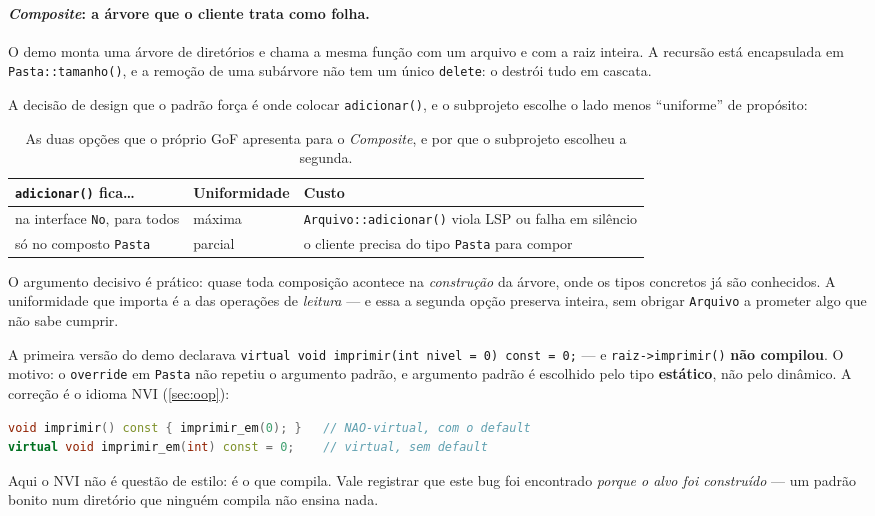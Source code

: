 \paragraph{\emph{Composite}: a árvore que o cliente trata como folha.} O demo
monta uma árvore de diretórios e chama a mesma função com um arquivo e com a
raiz inteira. A recursão está encapsulada em \texttt{Pasta::tamanho()}, e a
remoção de uma subárvore não tem um único \texttt{delete}: o
 destrói tudo em cascata.

A decisão de design que o padrão força é onde colocar \texttt{adicionar()}, e o
subprojeto escolhe o lado menos ``uniforme'' de propósito:

\begin{table}[htbp]
\centering
\caption{As duas opções que o próprio GoF apresenta para o \emph{Composite}, e
         por que o subprojeto escolheu a segunda.}
\label{tab:composite-opcoes}
\footnotesize
\begin{tabular}{@{}lll@{}}
\toprule
\textbf{\texttt{adicionar()} fica\ldots} & \textbf{Uniformidade} & \textbf{Custo} \\
\midrule
na interface \texttt{No}, para todos & máxima & \texttt{Arquivo::adicionar()} viola LSP ou falha em silêncio \\
só no composto \texttt{Pasta}        & parcial & o cliente precisa do tipo \texttt{Pasta} para compor \\
\bottomrule
\end{tabular}
\end{table}

O argumento decisivo é prático: quase toda composição acontece na
\emph{construção} da árvore, onde os tipos concretos já são conhecidos. A
uniformidade que importa é a das operações de \emph{leitura} --- e essa a
segunda opção preserva inteira, sem obrigar \texttt{Arquivo} a prometer algo que
não sabe cumprir.

\begin{armadilha}
A primeira versão do demo declarava
\texttt{virtual void imprimir(int nivel = 0) const = 0;} --- e
\texttt{raiz->imprimir()} \textbf{não compilou}. O motivo: o \texttt{override}
em \texttt{Pasta} não repetiu o argumento padrão, e argumento padrão é escolhido
pelo tipo \textbf{estático}, não pelo dinâmico. A correção é o idioma NVI
(\cref{sec:oop}):
\begin{lstlisting}[style=bt, language=C++, frame=none,
                   xleftmargin=0pt, xrightmargin=0pt]
void imprimir() const { imprimir_em(0); }   // NAO-virtual, com o default
virtual void imprimir_em(int) const = 0;    // virtual, sem default
\end{lstlisting}
Aqui o NVI não é questão de estilo: é o que compila. Vale registrar que este bug
foi encontrado \emph{porque o alvo foi construído} --- um padrão bonito num
diretório que ninguém compila não ensina nada.
\end{armadilha}

